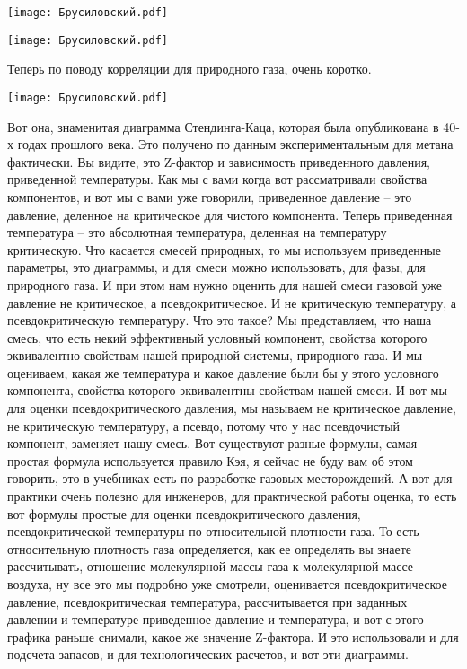 \documentclass[main.tex]{subfiles}
\begin{document}
\begin{center}
\texttt{[image: Брусиловский.pdf]}
\end{center}



\begin{center}
\texttt{[image: Брусиловский.pdf]}
\end{center}

Теперь по поводу корреляции для природного газа, очень коротко.

\begin{center}
\texttt{[image: Брусиловский.pdf]}
\end{center}

Вот она, знаменитая диаграмма Стендинга-Каца, которая была опубликована в 40-х годах прошлого века.
Это получено по данным экспериментальным для метана фактически.
Вы видите, это Z-фактор и зависимость приведенного давления, приведенной температуры.
Как мы с вами когда вот рассматривали свойства компонентов, и вот мы с вами уже говорили, приведенное давление -- это давление, деленное на критическое для чистого компонента.
Теперь приведенная температура -- это абсолютная температура, деленная на температуру критическую.
Что касается смесей природных, то мы используем приведенные параметры, это диаграммы, и для смеси можно использовать, для фазы, для природного газа.
И при этом нам нужно оценить для нашей смеси газовой уже давление не критическое, а псевдокритическое.
И не критическую температуру, а псевдокритическую температуру.
Что это такое?
Мы представляем, что наша смесь, что есть некий эффективный условный компонент, свойства которого эквивалентно свойствам нашей природной системы, природного газа.
И мы оцениваем, какая же температура и какое давление были бы у этого условного компонента, свойства которого эквивалентны свойствам нашей смеси.
И вот мы для оценки псевдокритического давления, мы называем не критическое давление, не критическую температуру, а псевдо, потому что у нас псевдочистый компонент, заменяет нашу смесь.
Вот существуют разные формулы, самая простая формула используется правило Кэя, я сейчас не буду вам об этом говорить, это в учебниках есть по разработке газовых месторождений.
А вот для практики очень полезно для инженеров, для практической работы оценка, то есть вот формулы простые для оценки псевдокритического давления, псевдокритической температуры по относительной плотности газа.
То есть относительную плотность газа определяется, как ее определять вы знаете рассчитывать, отношение молекулярной массы газа к молекулярной массе воздуха, ну все это мы подробно уже смотрели, оценивается псевдокритическое давление, псевдокритическая температура, рассчитывается при заданных давлении и температуре приведенное давление и температура, и вот с этого графика раньше снимали, какое же значение Z-фактора.
И это использовали и для подсчета запасов, и для технологических расчетов, и вот эти диаграммы.
\end{document}

